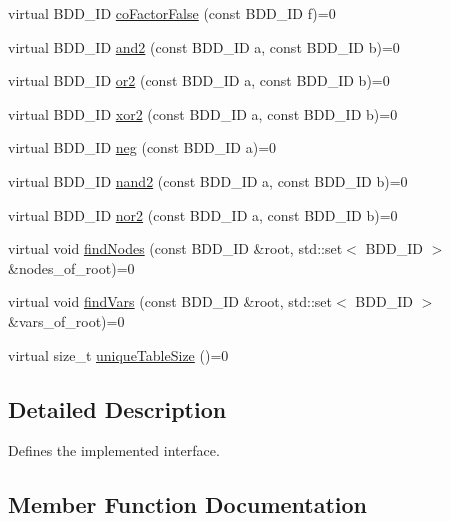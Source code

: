 \begin{DoxyCompactItemize}
\item 
virtual B\+D\+D\+\_\+\+ID \hyperlink{classManagerInterface_a8e4b1e439b4ce7d510d19ec1f45b03cf}{co\+Factor\+False} (const B\+D\+D\+\_\+\+ID f)=0
\item 
virtual B\+D\+D\+\_\+\+ID \hyperlink{classManagerInterface_ad3b2efbb8b99438198ab56c1a580e697}{and2} (const B\+D\+D\+\_\+\+ID a, const B\+D\+D\+\_\+\+ID b)=0
\item 
virtual B\+D\+D\+\_\+\+ID \hyperlink{classManagerInterface_abb14ac782d5527eb5dad1c1a456f6c5e}{or2} (const B\+D\+D\+\_\+\+ID a, const B\+D\+D\+\_\+\+ID b)=0
\item 
virtual B\+D\+D\+\_\+\+ID \hyperlink{classManagerInterface_a47d905e239650c255330b841edabd59d}{xor2} (const B\+D\+D\+\_\+\+ID a, const B\+D\+D\+\_\+\+ID b)=0
\item 
virtual B\+D\+D\+\_\+\+ID \hyperlink{classManagerInterface_af7c4261f0ae260de651909790d505555}{neg} (const B\+D\+D\+\_\+\+ID a)=0
\item 
virtual B\+D\+D\+\_\+\+ID \hyperlink{classManagerInterface_af51e4c180a25f80bdfd99ff7a9931477}{nand2} (const B\+D\+D\+\_\+\+ID a, const B\+D\+D\+\_\+\+ID b)=0
\item 
virtual B\+D\+D\+\_\+\+ID \hyperlink{classManagerInterface_ad7d0582df3df84dbb06930c6e3ac5d72}{nor2} (const B\+D\+D\+\_\+\+ID a, const B\+D\+D\+\_\+\+ID b)=0
\item 
virtual void \hyperlink{classManagerInterface_a7d2044388d1c5b8160a57f09596dae98}{find\+Nodes} (const B\+D\+D\+\_\+\+ID \&root, std\+::set$<$ B\+D\+D\+\_\+\+ID $>$ \&nodes\+\_\+of\+\_\+root)=0
\item 
virtual void \hyperlink{classManagerInterface_ab95672f3ba820047f67d52bdd323a955}{find\+Vars} (const B\+D\+D\+\_\+\+ID \&root, std\+::set$<$ B\+D\+D\+\_\+\+ID $>$ \&vars\+\_\+of\+\_\+root)=0
\item 
virtual size\+\_\+t \hyperlink{classManagerInterface_a88f79dbba9be5dc2a4e0fb21ac627c98}{unique\+Table\+Size} ()=0
\end{DoxyCompactItemize}


\subsection{Detailed Description}
Defines the implemented interface. 

\subsection{Member Function Documentation}
\mbox{\label{classManagerInterface_ad3b2efbb8b99438198ab56c1a580e697}} 
